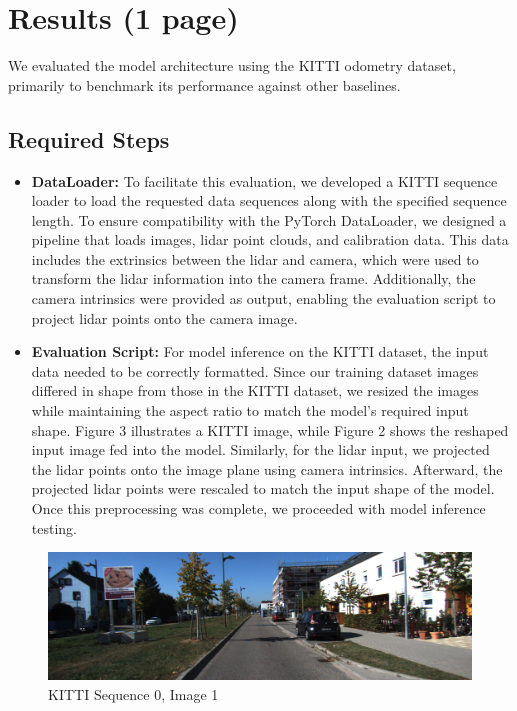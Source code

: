 \documentclass[11pt,a4paper]{article}
\begin{document}
\clearpage
\section{Results (1 page)}
We evaluated the model architecture using the KITTI odometry dataset, primarily to benchmark its performance against other baselines.


\subsection{Required Steps}

\begin{itemize}
    \item \textbf{DataLoader:} To facilitate this evaluation, we developed a KITTI sequence loader to load the requested data sequences along with the specified sequence length. To ensure compatibility with the PyTorch DataLoader, we designed a pipeline that loads images, lidar point clouds, and calibration data. This data includes the extrinsics between the lidar and camera, which were used to transform the lidar information into the camera frame. Additionally, the camera intrinsics were provided as output, enabling the evaluation script to project lidar points onto the camera image.
    
    \item \textbf{Evaluation Script:} For model inference on the KITTI dataset, the input data needed to be correctly formatted. Since our training dataset images differed in shape from those in the KITTI dataset, we resized the images while maintaining the aspect ratio to match the model's required input shape. Figure 3 illustrates a KITTI image, while Figure 2 shows the reshaped input image fed into the model. Similarly, for the lidar input, we projected the lidar points onto the image plane using camera intrinsics. Afterward, the projected lidar points were rescaled to match the input shape of the model. Once this preprocessing was complete, we proceeded with model inference testing.
\end{itemize}   

\begin{figure}[t]
    \centering
    \includegraphics[width=1.0\linewidth]{Reports/4-Final-Report/images/results/kitti-0.png}
    \caption{KITTI Sequence 0, Image 1}
    \label{fig:kitti-img1}
\end{figure}
\end{document}
